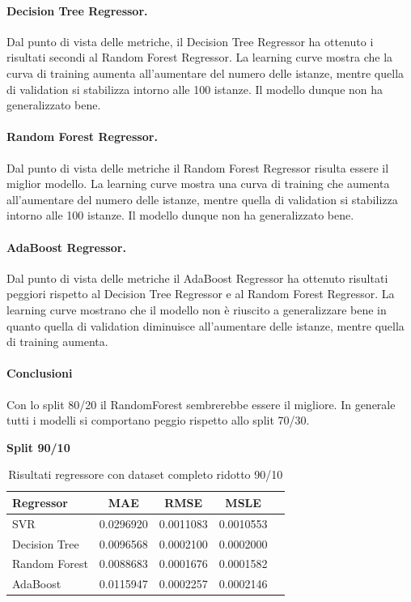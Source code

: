 \paragraph{\textbf{Decision Tree Regressor}.}
Dal punto di vista delle metriche, il Decision Tree Regressor ha ottenuto i risultati secondi al Random Forest Regressor. 
La learning curve mostra che la curva di training aumenta all'aumentare del numero delle istanze, mentre quella di validation si stabilizza intorno alle 100 istanze. Il modello dunque non ha generalizzato bene.
\paragraph{\textbf{Random Forest Regressor}.}
Dal punto di vista delle metriche il Random Forest Regressor risulta essere il miglior modello.
La learning curve mostra una curva di training che aumenta all'aumentare del numero delle istanze, mentre quella di validation si stabilizza intorno alle 100 istanze. Il modello dunque non ha generalizzato bene.
\paragraph{\textbf{AdaBoost Regressor}.}
Dal punto di vista delle metriche il AdaBoost Regressor ha ottenuto risultati peggiori rispetto al Decision Tree Regressor e al Random Forest Regressor.
La learning curve mostrano che il modello non è riuscito a generalizzare bene in quanto quella di validation diminuisce all'aumentare delle istanze, mentre quella di training aumenta.

\paragraph{\textbf{Conclusioni}} Con lo split 80/20 il RandomForest sembrerebbe essere il migliore. In generale tutti i modelli si comportano peggio rispetto allo split 70/30.


\newpage
\noindent\textbf{Split 90/10}

\begin{table}[H]
    \centering
    \begin{tabular}{|>{\centering\arraybackslash}m{5cm}|c|c|c|c|}
        \hline
        \textbf{Regressor} & \textbf{MAE} & \textbf{RMSE} & \textbf{MSLE} \\ [10pt]
        \hline
        SVR & 0.0296920 & 0.0011083 & 0.0010553 \\ [10pt]
        \hline
        Decision Tree & 0.0096568 & 0.0002100 & 0.0002000 \\ [10pt]
        \hline
        Random Forest & 0.0088683 & 0.0001676 & 0.0001582 \\ [10pt]
        \hline
        AdaBoost & 0.0115947 & 0.0002257 & 0.0002146 \\ [10pt]
        \hline
    \end{tabular}
    \caption{Risultati regressore con dataset completo ridotto 90/10}
    \label{tab:results}
\end{table}


